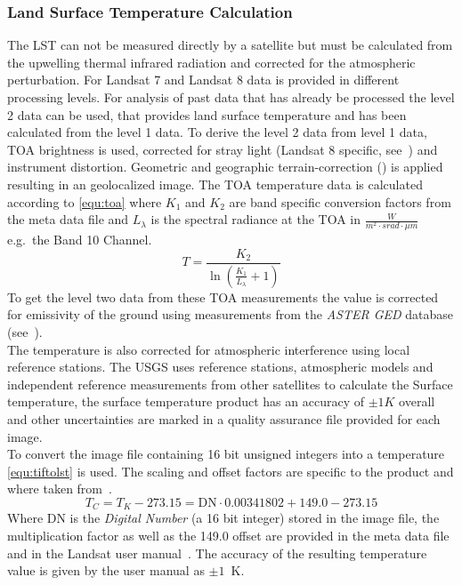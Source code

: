 \documentclass[12pt,a4paper, english,twoside]{scrartcl}
\begin{document}
    \subsubsection{Land Surface Temperature Calculation}\label{sec:lstcalc}
      The \gls{LST} can not be measured directly by a satellite but must be calculated from the upwelling thermal infrared radiation and corrected for the atmospheric perturbation. 
      For Landsat 7 and Landsat 8 data is provided in different processing levels.
      For analysis of past data that has already be processed the level 2 data can be used, that provides land surface temperature and has been calculated from the level 1 data. 
      To derive the level 2 data from level 1 data, \gls{TOA} brightness is used, corrected for stray light (Landsat 8 specific, see~\autocite[p.~67]{Zanter2019}) and instrument distortion. 
      Geometric and geographic terrain-correction (\cite[p.~44]{Zanter2019}) is applied resulting in an geolocalized image.
      The \gls{TOA} temperature data is calculated according to \cref{equ:toa} where $K_1$ and $K_2$ are band specific conversion factors from the meta data file and $L_\lambda$ is the spectral radiance at the \gls{TOA} in $\frac{W}{m^2\cdot srad \cdot \mu m}$ e.g.\ the Band 10 Channel. 
      \begin{equation}\label{equ:toa}
  	    T = \frac{K_2}{\ln\left(\frac{K_1}{L_{\lambda}}+1\right)}
      \end{equation}
      To get the level two data from these \gls{TOA} measurements the value is corrected for emissivity of the ground using measurements from the \textit{ASTER GED} database (see~\cite{USGSWebsite}).\\
      The temperature is also corrected for atmospheric interference using local reference stations. 
      The \gls{USGS} uses reference stations, atmospheric models and independent reference measurements from other satellites to calculate the Surface temperature, the surface temperature product has an accuracy of $\pm 1 K$ overall and other uncertainties are marked in a quality assurance file provided for each image.\\
      To convert the image file containing 16 bit unsigned integers into a temperature \cref{equ:tiftolst} is used. The scaling and offset factors are specific to the product and where taken from~\cite[Table 6-1]{EROASC2013}.
      \begin{equation}\label{equ:tiftolst}
        T_C = T_K - 273.15 = \text{DN} \cdot 0.00341802 + 149.0 - 273.15 
      \end{equation}
      Where DN is the \textit{Digital Number} (a 16 bit integer) stored in the image file, the multiplication factor as well as the 149.0 offset are provided in the meta data file and in the Landsat user manual~\autocite{EROASC2013}. 
      The accuracy of the resulting temperature value is given by the user manual as $\pm 1$~K.
      \newpage
\end{document}

